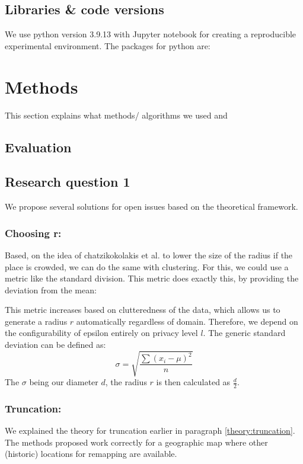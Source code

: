 \subsection{Libraries \& code versions}
We use python version 3.9.13 with Jupyter notebook for creating a reproducible experimental environment.
The packages for python are:

\newpage
\section{Methods}
This section explains what methods/ algorithms we used and
\subsection{Evaluation}
\subsection{Research question 1}

We propose several solutions for open issues based on the theoretical framework. \newline
\subsubsection{Choosing r: } Based, on the idea of chatzikokolakis et al. to lower the size of the radius if the place is crowded, we can do the same with clustering.
For this, we could use a metric like the standard division.
This metric does exactly this, by providing the deviation from the mean:

This metric increases based on clutteredness of the data, which allows us to generate a radius $r$ automatically regardless of domain.
Therefore, we depend on the configurability of epsilon entirely on privacy level $l$.
The generic standard deviation can be defined as:
\begin{equation}
  \sigma = \sqrt{\frac{\sum{(x_i - \mu)^2}}{n}}
\end{equation}
The $\sigma$ being our diameter $d$, the radius $r$ is then calculated as $\frac{d}{2}$. \newline
\subsubsection{Truncation: }
We explained the theory for truncation earlier in paragraph \ref{theory:truncation}.
The methods proposed work correctly for a geographic map where other (historic) locations for remapping are available.


